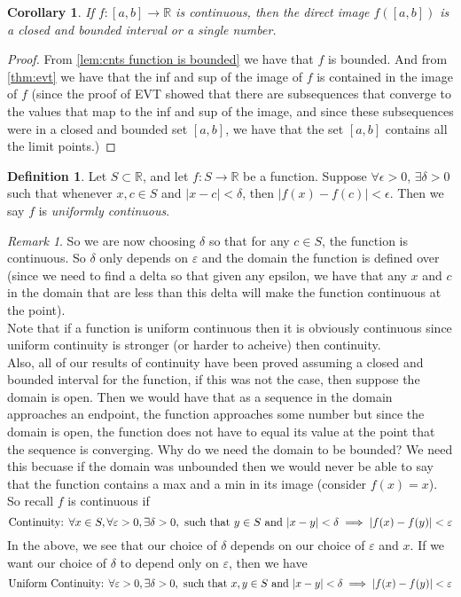 \documentclass{article}
\newtheorem{corollary}{Corollary}[section]
\theoremstyle{definition}
\newtheorem{definition}{Definition}[section]
\theoremstyle{remark}
\newtheorem{remark}{Remark}[section]
\begin{document}
\begin{corollary}
If $f : [a, b] \to \mathbb{R}$ is continuous, then the direct image $f([a, b])$ is a closed and bounded interval or a single number.
\end{corollary}
\begin{proof}
From \ref{lem:cnts function is bounded} we have that $f$ is bounded. 
And from \ref{thm:evt} we have that the inf and sup of the image of $f$ is 
contained in the image of $f$ (since the proof of EVT showed that 
there are subsequences that converge to the values that map to the inf and sup
of the image, and since these subsequences were in a closed and bounded set $[a,b]$, we have that
the set $[a,b]$ contains all the limit points.)
\end{proof}


\vspace{.5cm}


\begin{definition}\label{def:uniform continuity}
Let $S \subset \mathbb{R}$, and let $f : S \to \mathbb{R}$ be a function. Suppose $\forall \epsilon > 0$, $\exists \delta > 0$ such that whenever $x, c \in S$ and $|x - c| < \delta$, then $|f(x) - f(c)| < \epsilon$. Then we say $f$ is \emph{uniformly continuous}.
\end{definition}
\begin{remark}
So we are now choosing $\delta$ so that for any $c \in S$, the function is continuous. 
So $\delta$ only depends on $\varepsilon$ and the domain the function is defined over (since we need 
to find a delta so that given any epsilon, we have that any $x$ and $c$ in the domain that are 
less than this delta will make the function continuous at the point).\\
Note that if a function is uniform continuous then it is obviously
continuous since uniform continuity is stronger (or harder to acheive) then continuity.\\
Also, all of our results of continuity have been proved assuming a closed and bounded
interval for the function, if this was not the case, then suppose the domain is open. 
Then we would have that as a sequence in the domain approaches an endpoint, 
the function approaches some number but since the domain is open, the function does not have
to equal its value at the point that the sequence is converging. Why do we need the domain to be bounded? 
We need this becuase if the domain was unbounded then we would never be able to 
say that the function contains a max and a min in its image (consider $f(x) = x$).\\
So recall $f$ is continuous if \[
\textnormal{Continuity: } \forall x \in S, \forall \varepsilon > 0, \exists \delta > 0, \textnormal{ such that } y \in S \textnormal{ and } |x-y| < \delta \implies |f(x) - f(y)| < \varepsilon
\]
In the above, we see that our choice of $\delta$ depends on our choice of $\varepsilon$ and $x$. If we want our choice of 
$\delta$ to depend only on $\varepsilon$, then we have
\[
\textnormal{Uniform Continuity: } \forall \varepsilon > 0, \exists \delta > 0, \textnormal{ such that } x,y \in S \textnormal{ and } |x-y| < \delta \implies |f(x) - f(y)| < \varepsilon
\]

\end{remark}
\end{document}
